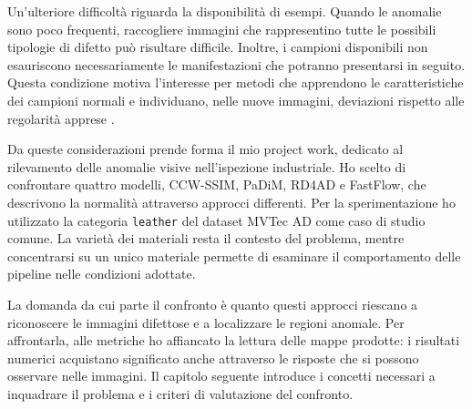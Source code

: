 Un'ulteriore difficoltà riguarda la disponibilità di esempi. Quando le anomalie sono poco frequenti, raccogliere immagini che rappresentino tutte le possibili tipologie di difetto può risultare difficile. Inoltre, i campioni disponibili non esauriscono necessariamente le manifestazioni che potranno presentarsi in seguito. Questa condizione motiva l'interesse per metodi che apprendono le caratteristiche dei campioni normali e individuano, nelle nuove immagini, deviazioni rispetto alle regolarità apprese \cite{Pang_et_al._2021,Yang_et_al._2021}.

Da queste considerazioni prende forma il mio project work, dedicato al rilevamento delle anomalie visive nell'ispezione industriale. Ho scelto di confrontare quattro modelli, CCW-SSIM, PaDiM, RD4AD e FastFlow, che descrivono la normalità attraverso approcci differenti. Per la sperimentazione ho utilizzato la categoria \texttt{leather} del dataset MVTec AD come caso di studio comune. La varietà dei materiali resta il contesto del problema, mentre concentrarsi su un unico materiale permette di esaminare il comportamento delle pipeline nelle condizioni adottate.

La domanda da cui parte il confronto è quanto questi approcci riescano a riconoscere le immagini difettose e a localizzare le regioni anomale. Per affrontarla, alle metriche ho affiancato la lettura delle mappe prodotte: i risultati numerici acquistano significato anche attraverso le risposte che si possono osservare nelle immagini. Il capitolo seguente introduce i concetti necessari a inquadrare il problema e i criteri di valutazione del confronto.
